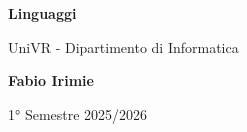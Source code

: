 \begin{titlepage}
	\begin{center}
		\vspace*{1cm}

		\Huge
		\textbf{Linguaggi}

		\vspace{0.5cm}
		\LARGE
		UniVR - Dipartimento di Informatica

		\vspace{1.5cm}

		\textbf{Fabio Irimie}

		\vfill


		\vspace{0.8cm}


		1° Semestre 2025/2026

	\end{center}
\end{titlepage}
